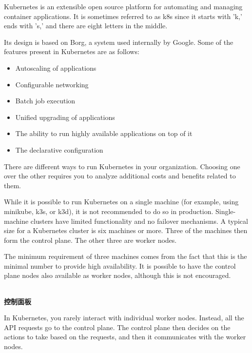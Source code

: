 
Kubernetes is an extensible open source platform for automating and managing container applications. It is sometimes referred to as k8s since it starts with 'k,' ends with 's,' and there are eight letters in the middle.

Its design is based on Borg, a system used internally by Google. Some of the features present in Kubernetes are as follows:

\begin{itemize}
\item 
Autoscaling of applications

\item 
Configurable networking

\item 
Batch job execution

\item 
Unified upgrading of applications

\item 
The ability to run highly available applications on top of it

\item 
The declarative configuration
\end{itemize}

There are different ways to run Kubernetes in your organization. Choosing one over the other requires you to analyze additional costs and benefits related to them.


While it is possible to run Kubernetes on a single machine (for example, using minikube, k3s, or k3d), it is not recommended to do so in production. Single-machine clusters have limited functionality and no failover mechanisms. A typical size for a Kubernetes cluster is six machines or more. Three of the machines then form the control plane. The other three are worker nodes.

The minimum requirement of three machines comes from the fact that this is the minimal number to provide high availability. It is possible to have the control plane nodes also available as worker nodes, although this is not encouraged.

\hspace*{\fill} \\ %
\noindent
\textbf{控制面板}

In Kubernetes, you rarely interact with individual worker nodes. Instead, all the API requests go to the control plane. The control plane then decides on the actions to take based on the requests, and then it communicates with the worker nodes.

